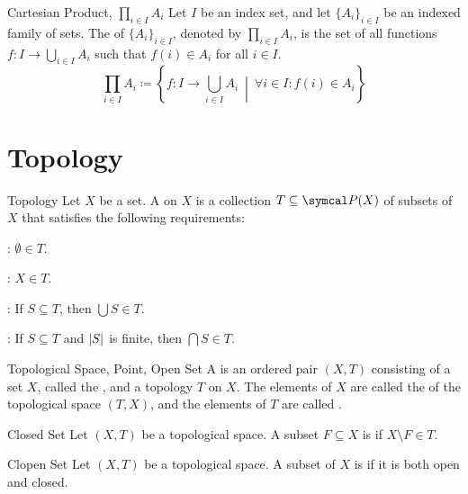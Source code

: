 \documentclass[12pt]{report}
\begin{document}
\begin{dfnbox}{Cartesian Product, $\prod_{i \in I} A_i$}
	Let $I$ be an index set, and let $\{ A_i \}_{i \in I}$ be an indexed family of sets. The  of $\{ A_i \}_{i \in I}$, denoted by $\prod_{i \in I} A_i$, is the set of all functions $f: I \to \bigcup_{i \in I} A_i$ such that $f(i) \in A_i$ for all $i \in I$.
	\[ \prod_{i \in I} A_i \coloneq \left\{ f: I \to \bigcup_{i \in I} A_i \ \middle|\ \forall i \in I : f(i) \in A_i \right\} \]
\end{dfnbox}



\chapter{Topology}

\begin{dfnbox}{Topology}
	Let $X$ be a set. A  on $X$ is a collection $T \subseteq \powerset(X)$ of subsets of $X$ that satisfies the following requirements:
	\begin{boxitems}
		\item {}: $\emptyset \in T$.
		\item {}: $X \in T$.
		\item {}: If $S \subseteq T$, then $\bigcup S \in T$.
		\item {}: If $S \subseteq T$ and ${\left\lvert {S} \right\rvert}$ is finite, then $\bigcap S \in T$.
	\end{boxitems}
\end{dfnbox}

\begin{dfnbox}{Topological Space, Point, Open Set}
	A  is an ordered pair $(X, T)$ consisting of a set $X$, called the , and a topology $T$ on $X$. The elements of $X$ are called the  of the topological space $(T, X)$, and the elements of $T$ are called .
\end{dfnbox}

\begin{dfnbox}{Closed Set}
	Let $(X, T)$ be a topological space. A subset $F \subseteq X$ is  if $X \setminus F \in T$.
\end{dfnbox}

\begin{dfnbox}{Clopen Set}
	Let $(X, T)$ be a topological space. A subset of $X$ is  if it is both open and closed.
\end{dfnbox}
\end{document}
